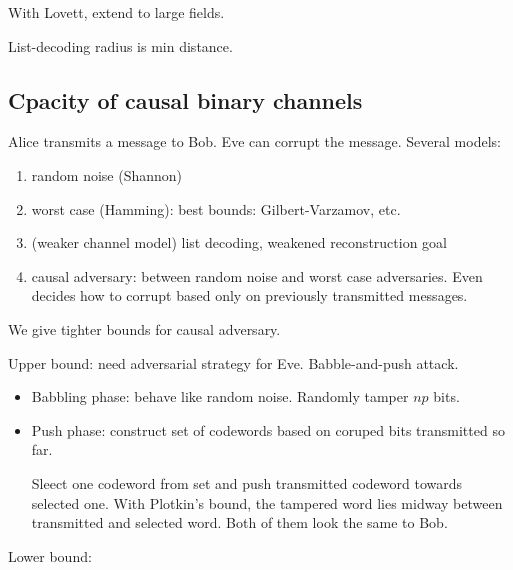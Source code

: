 With Lovett, extend to large fields.

List-decoding radius is min distance.


\subsection{Cpacity of causal binary channels}

Alice transmits a message to Bob. Eve can corrupt the message. Several models:
\begin{enumerate}
\item
random noise (Shannon)
\item
worst case (Hamming): best bounds: Gilbert-Varzamov, etc.
\item
(weaker channel model) list decoding, weakened reconstruction goal
\item
causal adversary: between random noise and worst case adversaries. Even decides how to corrupt based only on previously transmitted messages. 
\end{enumerate}
We give tighter bounds for causal adversary.

Upper bound: need adversarial strategy for Eve. Babble-and-push attack. 

\begin{itemize}
\item
Babbling phase: behave like random noise. Randomly tamper $np$ bits. 
\item
Push phase: construct set of codewords based on coruped bits transmitted so far. %

Sleect one codeword from set and push transmitted codeword towards selected one. With Plotkin's bound, the tampered word lies midway between transmitted and selected word. Both of them look the same to Bob.
\end{itemize}

Lower bound:


